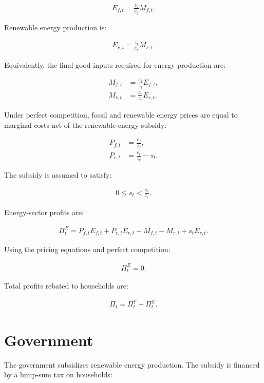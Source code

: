 \documentclass[12pt]{article}
\begin{document}
\begin{align}
E_{f,t}
=
\frac{z_f}{c_f}M_{f,t}.
\end{align}

Renewable energy production is:

\begin{align}
E_{r,t}
=
\frac{z_r}{c_r}M_{r,t}.
\end{align}

Equivalently, the final-good inputs required for energy production are:

\begin{align}
M_{f,t}
&=
\frac{c_f}{z_f}E_{f,t},
\\
M_{r,t}
&=
\frac{c_r}{z_r}E_{r,t}.
\end{align}

Under perfect competition, fossil and renewable energy prices are equal to marginal costs net of the renewable energy subsidy:

\begin{align}
P_{f,t}
&=
\frac{c_f}{z_f},
\\
P_{r,t}
&=
\frac{c_r}{z_r}
-
s_t.
\end{align}

The subsidy is assumed to satisfy:

\begin{align}
0
\leq
s_t
<
\frac{c_r}{z_r}.
\end{align}

Energy-sector profits are:

\begin{align}
\Pi^E_t
=
P_{f,t}E_{f,t}
+
P_{r,t}E_{r,t}
-
M_{f,t}
-
M_{r,t}
+
s_tE_{r,t}.
\end{align}

Using the pricing equations and perfect competition:

\begin{align}
\Pi^E_t = 0.
\end{align}

Total profits rebated to households are:

\begin{align}
\Pi_t
=
\Pi^Y_t
+
\Pi^E_t.
\end{align}

\section{Government}

The government subsidizes renewable energy production. The subsidy is financed by a lump-sum tax on households:
\end{document}
